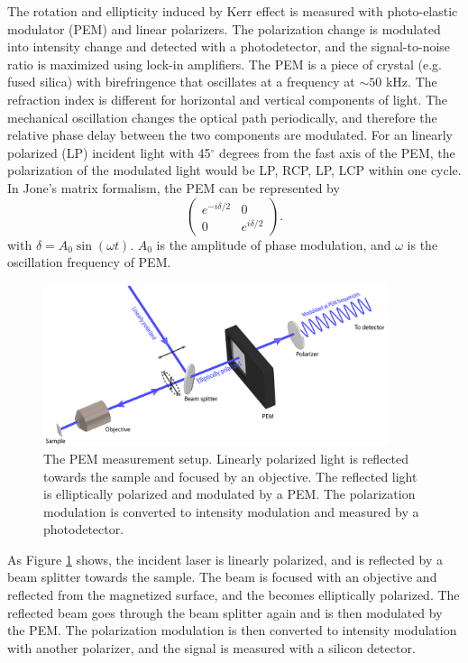 \documentclass[pdflatex, sectionletters, 12pt]{pittetd}    %
\begin{document}
The rotation and ellipticity induced by Kerr effect is measured with photo-elastic modulator (PEM) and linear polarizers. The polarization change is modulated into intensity change and detected with a photodetector, and the signal-to-noise ratio is maximized using lock-in amplifiers. The PEM is a piece of crystal (e.g. fused silica) with birefringence that oscillates at a frequency at $\sim 50$ kHz. The refraction index is different for horizontal and vertical components of light. The mechanical oscillation changes the optical path periodically, and therefore the relative phase delay between the two components are modulated. For an linearly polarized (LP) incident light with 45$^{\circ}$ degrees from the fast axis of the PEM, the polarization of the modulated light would be LP, RCP, LP, LCP within one cycle. In Jone's matrix formalism, the PEM can be represented by
$$
\begin{pmatrix}
e^{-i\delta/2} & 0 \\
0 & e^{i\delta/2}
\end{pmatrix}.
$$ 
with $\delta = A_0 \sin (\omega t)$. $A_0$ is the amplitude of phase modulation, and $\omega$ is the oscillation frequency of PEM.

\begin{figure}[h!]
	\centering
	\includegraphics[width=0.9\textwidth]{Drawing/PEMOptics_small.png}
	\caption{The PEM measurement setup. Linearly polarized light is reflected towards the sample and focused by an objective. The reflected light is elliptically polarized and modulated by a PEM. The polarization modulation is converted to intensity modulation and measured by a photodetector.}
	\label{FIG:PEMOptics}
\end{figure}

As Figure \ref{FIG:PEMOptics} shows, the incident laser is linearly polarized, and is reflected by a beam splitter towards the sample. The beam is focused with an objective and reflected from the magnetized surface, and the becomes elliptically polarized. The reflected beam goes through the beam splitter again and is then modulated by the PEM. The polarization modulation is then converted to intensity modulation with another polarizer, and the signal is measured with a silicon detector.
\end{document}
